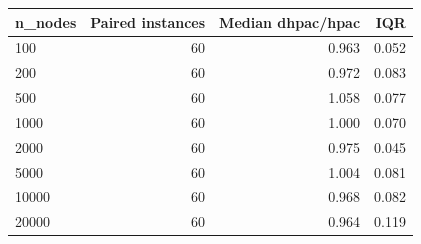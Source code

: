 \begin{tabular}{lrrr}
\toprule
n\_nodes & Paired instances & Median dhpac/hpac & IQR \\
\midrule
100 & 60 & 0.963 & 0.052 \\
200 & 60 & 0.972 & 0.083 \\
500 & 60 & 1.058 & 0.077 \\
1000 & 60 & 1.000 & 0.070 \\
2000 & 60 & 0.975 & 0.045 \\
5000 & 60 & 1.004 & 0.081 \\
10000 & 60 & 0.968 & 0.082 \\
20000 & 60 & 0.964 & 0.119 \\
\bottomrule
\end{tabular}
